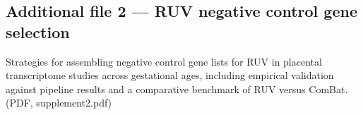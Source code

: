\documentclass[11pt,a4paper]{article}
\begin{document}
\subsection*{Additional file 2 --- RUV negative control gene selection}
Strategies for assembling negative control gene lists for RUV in
placental transcriptome studies across gestational ages, including
empirical validation against pipeline results and a comparative
benchmark of RUV versus ComBat.
(PDF, supplement2.pdf)
\end{document}
